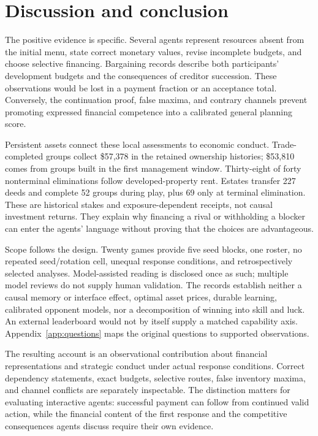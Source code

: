 \section{Discussion and conclusion}

The positive evidence is specific. Several agents represent resources absent from the initial menu, state correct monetary values, revise incomplete budgets, and choose selective financing. Bargaining records describe both participants' development budgets and the consequences of creditor succession. These observations would be lost in a payment fraction or an acceptance total. Conversely, the continuation proof, false maxima, and contrary channels prevent promoting expressed financial competence into a calibrated general planning score.

Persistent assets connect these local assessments to economic conduct. Trade-completed groups collect \$57,378 in the retained ownership histories; \$53,810 comes from groups built in the first management window. Thirty-eight of forty nonterminal eliminations follow developed-property rent. Estates transfer 227 deeds and complete 52 groups during play, plus 69 only at terminal elimination. These are historical stakes and exposure-dependent receipts, not causal investment returns. They explain why financing a rival or withholding a blocker can enter the agents' language without proving that the choices are advantageous.

Scope follows the design. Twenty games provide five seed blocks, one roster, no repeated seed/rotation cell, unequal response conditions, and retrospectively selected analyses. Model-assisted reading is disclosed once as such; multiple model reviews do not supply human validation. The records establish neither a causal memory or interface effect, optimal asset prices, durable learning, calibrated opponent models, nor a decomposition of winning into skill and luck. An external leaderboard would not by itself supply a matched capability axis. Appendix~\ref{app:questions} maps the original questions to supported observations.

The resulting account is an observational contribution about financial representations and strategic conduct under actual response conditions. Correct dependency statements, exact budgets, selective routes, false inventory maxima, and channel conflicts are separately inspectable. The distinction matters for evaluating interactive agents: successful payment can follow from continued valid action, while the financial content of the first response and the competitive consequences agents discuss require their own evidence.
